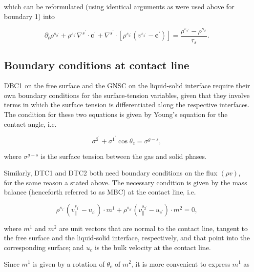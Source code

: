 \documentclass{article}
\begin{document}
which can be reformulated (using identical arguments as were used above for boundary 1) into

\begin{equation}
\partial_{t}\rho^{s_{2^{\prime}}} + \rho^{s_{2^{\prime}}}\nabla^{s^{\prime}}\cdot \pmb{c}^{\prime} + \nabla^{s^{\prime}}\cdot [\rho^{s_{2^{\prime}}}(v^{s_{2^{\prime}}} - \pmb{c}^{\prime})] = \frac{\rho^{s_{2^{\prime}}} - \rho^{s_{2^{\prime}}}}{\tau_{s}}. \tag{2.27}
\end{equation}

\subsection{Boundary conditions at contact line}

DBC1 on the free surface and the GNSC on the liquid-solid interface require their own boundary conditions for the surface-tension variables, given that they involve terms in which the surface tension is differentiated along the respective interfaces. The condition for these two equations is given by Young's equation for the contact angle, i.e.

\begin{equation}
\sigma^{2^{\prime}} + \sigma^{1^{\prime}}\cos \theta_{c} = \sigma^{g - s}, \tag{2.28}
\end{equation}

where \(\sigma^{g - s}\) is the surface tension between the gas and solid phases.

Similarly, DTC1 and DTC2 both need boundary conditions on the flux \((\rho v)\), for the same reason a stated above. The necessary condition is given by the mass balance (henceforth referred to as MBC) at the contact line, i.e.

\begin{equation}
\rho^{s_{1^{\prime}}}\left(v_{\parallel}^{s_{1^{\prime}}} - u_{c^{\prime}}\right)\cdot m^{1} + \rho^{s_{2^{\prime}}}\left(v_{\parallel}^{s_{2^{\prime}}} - u_{c^{\prime}}\right)\cdot m^{2} = 0, \tag{2.29}
\end{equation}

where \(m^{1}\) and \(m^{2}\) are unit vectors that are normal to the contact line, tangent to the free surface and the liquid-solid interface, respectively, and that point into the corresponding surface; and \(u_{c}\) is the bulk velocity at the contact line.

Since \(m^{1}\) is given by a rotation of \(\theta_{c}\) of \(m^{2}\), it is more convenient to express \(m^{1}\) as
\end{document}
